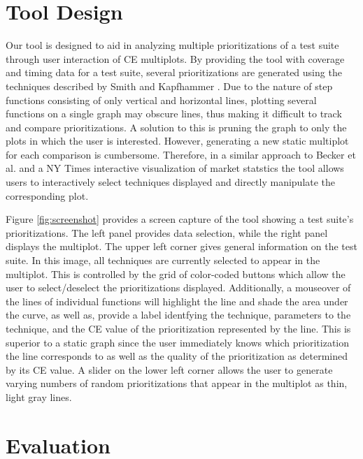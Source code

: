 \documentclass{vgtc}                          %
\begin{document}
\section{Tool Design}

Our tool is designed to aid in analyzing multiple prioritizations of a test suite through user interaction of CE multiplots.  By providing the tool with coverage and timing data for a test suite, several prioritizations are generated using the techniques described by Smith and Kapfhammer \cite{smith:2009}.  Due to the nature of step functions consisting of only vertical and horizontal lines, plotting several functions on a single graph may obscure lines, thus making it difficult to track and compare prioritizations.  A solution to this is pruning the graph to only the plots in which the user is interested.  However, generating a new static multiplot for each comparison is cumbersome.  Therefore, in a similar approach to Becker et al. \cite{Stephen95visualizingnetwork} and a NY Times interactive visualization of market statstics \cite{nytime_multiplot} the tool allows users to interactively select techniques displayed and directly manipulate the corresponding plot.

Figure \ref{fig:screenshot} provides a screen capture of the tool showing a test suite's prioritizations.  The left panel provides data selection, while the right panel displays the multiplot.  The upper left corner gives general information on the test suite.  In this image, all techniques are currently selected to appear in the multiplot.  This is controlled by the grid of color-coded buttons which allow the user to select/deselect the prioritizations displayed.  Additionally, a mouseover of the lines of individual functions will highlight the line and shade the area under the curve, as well as, provide a label identfying the technique, parameters to the technique, and the CE value of the prioritization represented by the line.  This is superior to a static graph since the user immediately knows which prioritization the line corresponds to as well as the quality of the prioritization as determined by its CE value.  A slider on the lower left corner allows the user to generate varying numbers of random prioritizations that appear in the multiplot as thin, light gray lines.


\section{Evaluation}
\end{document}
